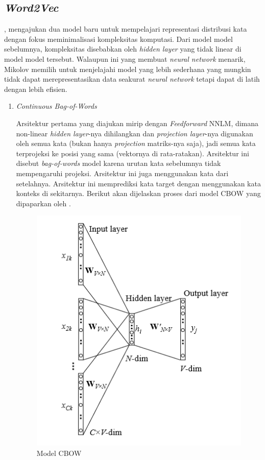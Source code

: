 \documentclass[12pt]{report}
\begin{document}
\subsection{\textit{Word2Vec}}
, mengajukan dua model baru untuk mempelajari representasi distribusi kata dengan fokus meminimalisasi kompleksitas komputasi. Dari model model sebelumnya, kompleksitas disebabkan oleh \textit{hidden layer} yang tidak linear di model model tersebut. Walaupun ini yang membuat \textit{neural network} menarik, Mikolov memilih untuk menjelajahi model yang lebih sederhana yang mungkin tidak dapat merepresentasikan data seakurat \textit{neural network} tetapi dapat di latih dengan lebih efisien.
\begin{enumerate}
\item \textit{Continuous Bag-of-Words}


Arsitektur pertama yang diajukan mirip dengan \textit{Feedforward} NNLM, dimana non-linear \textit{hidden layer}-nya dihilangkan dan \textit{projection layer}-nya digunakan oleh semua kata (bukan hanya \textit{projection} matriks-nya saja), jadi semua kata terprojeksi ke posisi yang sama (vektornya di rata-ratakan). Arsitektur ini disebut \textit{bag-of-words} model karena urutan kata sebelumnya tidak mempengaruhi projeksi. Arsitektur ini juga menggunakan kata dari setelahnya. Arsitektur ini memprediksi kata target dengan menggunakan kata konteks di sekitarnya. Berikut akan dijelaskan proses dari model CBOW yang dipaparkan oleh .


\begin{figure}[H]
\centering
\includegraphics[scale=0.75]{modelcbow}
\caption{Model CBOW}
\label{modelcbow}
\end{figure}


\end{enumerate}
\end{document}
